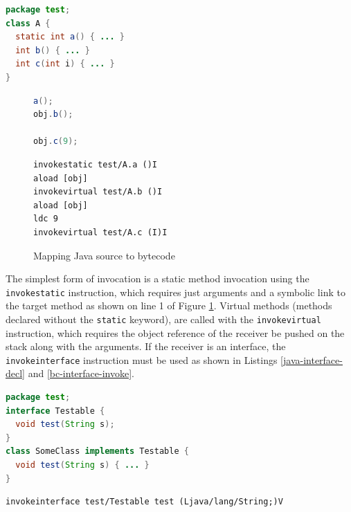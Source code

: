 \begin{lstlisting}[language=Java,caption=Java class methods,label=method-java]
package test;
class A {
  static int a() { ... }
  int b() { ... }
  int c(int i) { ... }
}
\end{lstlisting}

\begin{figure}[htbp]

\begin{minipage}[t]{0.45\textwidth}
\begin{lstlisting}[language=Java,frame=tlrb]
a();
obj.b();

obj.c(9);
\end{lstlisting}
\end{minipage}
\hspace{0.5cm}
\begin{minipage}[t]{0.45\textwidth}
\begin{lstlisting}[language=jvm-bytecode,frame=tlrb]
invokestatic test/A.a ()I
aload [obj]
invokevirtual test/A.b ()I
aload [obj]
ldc 9
invokevirtual test/A.c (I)I
\end{lstlisting}
\end{minipage}

\caption[Invocation Bytecode]{Mapping Java source to bytecode}
\label{fig:invoke-src-to-bc}
\end{figure}

The simplest form of invocation is a static method invocation using the \texttt{invokestatic} instruction, which requires just arguments and a symbolic link to the target method as shown on line 1 of Figure \ref{fig:invoke-src-to-bc}.  Virtual methods (methods declared without the \texttt{static} keyword), are called with the \texttt{invokevirtual} instruction, which requires the object reference of the receiver be pushed on the stack along with the arguments.  If the receiver is an interface, the \texttt{invokeinterface} instruction must be used as shown in Listings \ref{java-interface-decl} and \ref{bc-interface-invoke}.

\begin{lstlisting}[language=Java,caption=Java interface declaration,label=java-interface-decl]
package test;
interface Testable {
  void test(String s);
}
class SomeClass implements Testable {
  void test(String s) { ... }
}
\end{lstlisting}
\vspace{2em}
\begin{lstlisting}[language=jvm-bytecode,caption=Java interface invocation,label=bc-interface-invoke]
invokeinterface test/Testable test (Ljava/lang/String;)V
\end{lstlisting}

